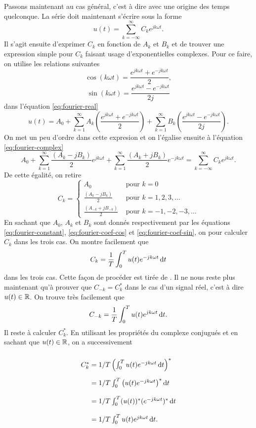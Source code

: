 Passons maintenant au cas général, c'est à
dire avec une origine des temps quelconque.
La série doit maintenant s'écrire sous la
forme
\begin{equation}
	u(t) = \sum_{k=-\infty}^\infty C_k e^{jk\omega t}.
	\label{eq:fourier-complex}
\end{equation}
Il s'agit ensuite d'exprimer $C_k$ en fonction
de $A_k$ et $B_k$ et de trouver une expression
simple pour $C_k$ faisant usage d'exponentielles
complexes. Pour ce faire, on utilise les relations
suivantes
\[ \cos(k\omega t) = \frac{e^{jk\omega t}+e^{-jk\omega t}}{2},\]
\[ \sin(k\omega t) = \frac{e^{jk\omega t}-e^{-jk\omega t}}{2j}\]
dans l'équation \ref{eq:fourier-real}
\[ u(t) = A_0 + \sum_{k=1}^{\infty} A_k\left(\frac{e^{jk\omega t}+e^{-jk\omega t}}{2}\right)
	+ \sum_{k=1}^{\infty} B_k\left(\frac{e^{jk\omega t}-e^{-jk\omega t}}{2j}\right). \]
On met un peu d'ordre dans cette expresion et on l'égalise 
ensuite à l'équation \ref{eq:fourier-complex}
\[ A_0 + \sum_{k=1}^{\infty} \frac{(A_k-jB_k)}{2}e^{jk\omega t}
	+ \sum_{k=1}^{\infty} \frac{(A_k+jB_k)}{2}e^{-jk\omega t} = 
	\sum_{k=-\infty}^\infty C_k e^{jk\omega t}.\]
De cette égalité, on retire
\[ C_k =
	\left\{
		\begin{array}{cl}
			A_0 & \text{ pour } k = 0 \\
			\frac{(A_k-jB_k)}{2} & \text{ pour } k = 1,2,3,\dots \\
			\frac{(A_{-k}+jB_{-k})}{2} & \text{ pour } k = -1,-2,-3,\dots
		\end{array}
	\right.
\]
En sachant que $A_0$, $A_k$ et $B_k$ sont
donnés respectivement par les équations
\ref{eq:fourier-constant}, \ref{eq:fourier-coef-cos}
et \ref{eq:fourier-coef-sin}, on pour calculer
$C_k$ dans les trois cas. On montre facilement que
\[ C_k = \frac{1}{T} \int_0^T u(t)e^{-jk\omega t}\operatorname{d}\! t\]
dans les trois cas. Cette façon de procéder est tirée de 
\cite{complex-fourier-series}.
Il ne nous reste plus maintenant qu'à prouver
que $C_{-k} = C_k^*$ dans le cas d'un signal réel,
c'est à dire $u(t) \in \mathbb{R}$. On trouve très facilement que
\begin{equation}
	C_{-k} = \frac{1}{T} \int_0^T u(t)e^{jk\omega t}\operatorname{d}\! t.
	\label{eq:c-minus}
\end{equation}
Il reste à calculer $C^*_k$. En utilisant les propriétés
du complexe conjugués et en sachant que $u(t) \in \mathbb{R}$,
on a successivement

\[\arraycolsep=1.4pt\def\arraystretch{2.2}
	\begin{array}{cl}
		C_k^* &= 1/T \left(\int_0^T u(t)e^{-jk\omega t} \dif t\right)^* \\ 
					&= 1/T \int_0^T \left(u(t)e^{-jk\omega t}\right)^* \dif t \\
					&= 1/T \int_0^T (u(t))^*(e^{-jk\omega t})^* \dif t \\
					&= 1/T \int_0^T u(t)e^{jk\omega t} \dif t.
	\end{array}
\]

